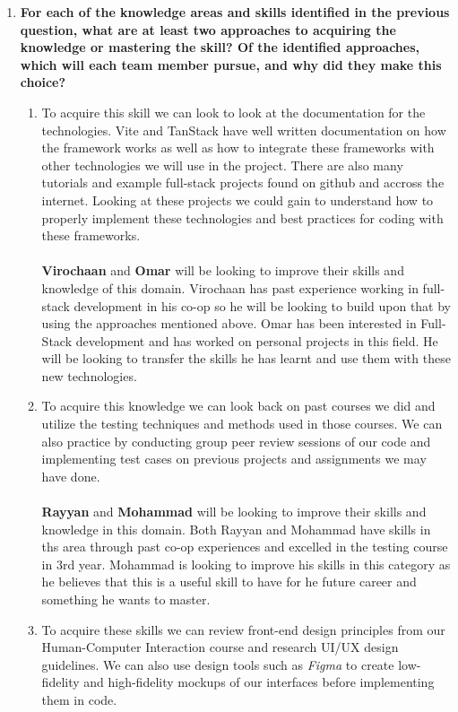 \begin{enumerate}
\begin{enumerate}
  \end{enumerate}
  \item \textbf{For each of the knowledge areas and skills identified in the previous question, what are at least two approaches to acquiring the knowledge or mastering the skill?  Of the identified approaches, which will each team member pursue, and why did they make this choice?} \\
  \begin{enumerate}
    \item To acquire this skill we can look to look at the documentation for the technologies. Vite and TanStack have well written documentation on how the framework works as well as how to integrate these frameworks with other technologies we will use in the project. There are also many tutorials and example full-stack projects found on github and accross the internet. Looking at these projects we could gain to understand how to properly implement these technologies and best practices for coding with these frameworks. \\
    \\
    \textbf{Virochaan} and \textbf{Omar} will be looking to improve their skills and knowledge of this domain. Virochaan has past experience working in full-stack development in his co-op so he will be looking to build upon that by using the approaches mentioned above. Omar has been interested in Full-Stack development and has worked on personal projects in this field. He will be looking to transfer the skills he has learnt and use them with these new technologies.\\
    \item To acquire this knowledge we can look back on past courses we did and utilize the testing techniques and methods used in those courses. We can also practice by conducting group peer review sessions of our code and implementing test cases on previous projects and assignments we may have done. \\
    \\
    \textbf{Rayyan} and \textbf{Mohammad} will be looking to improve their skills and knowledge in this domain. Both Rayyan and Mohammad have skills in ths area through past co-op experiences and excelled in the testing course in 3rd year. Mohammad is looking to improve his skills in this category as he believes that this is a useful skill to have for he future career and something he wants to master.\\
    \item To acquire these skills we can review front-end design principles from our Human-Computer Interaction course and research UI/UX design guidelines. We can also use design tools such as \textit{Figma} to create low-fidelity and high-fidelity mockups of our interfaces before implementing them in code. \\

\end{enumerate}
\end{enumerate}
